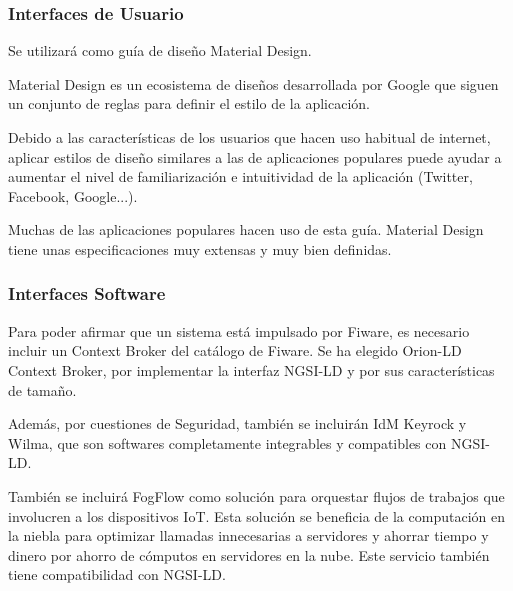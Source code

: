 \documentclass[12pt, a4paper, twoside]{article}
\begin{document}
\subsubsection{Interfaces de Usuario}
Se utilizará como guía de diseño Material Design.

Material Design es un ecosistema de diseños desarrollada por Google
que siguen un conjunto de reglas para definir el estilo de la aplicación.

Debido a las características de los usuarios que hacen uso habitual de internet,
aplicar estilos de diseño similares a las de aplicaciones populares puede ayudar a aumentar
el nivel de familiarización e intuitividad de la aplicación (Twitter, Facebook, Google...).

Muchas de las aplicaciones populares hacen uso de esta guía.
Material Design tiene unas especificaciones muy extensas y muy bien definidas. 

\subsubsection{Interfaces Software}
Para poder afirmar que un sistema está impulsado por Fiware, es necesario incluir un Context Broker del catálogo de Fiware.
Se ha elegido Orion-LD Context Broker, por implementar la interfaz NGSI-LD y por sus características de tamaño.

Además, por cuestiones de Seguridad, también se incluirán IdM Keyrock y Wilma, que son softwares completamente integrables y
compatibles con NGSI-LD. 

También se incluirá FogFlow como solución para orquestar flujos de trabajos que involucren a los dispositivos IoT. Esta solución 
se beneficia de la computación en la niebla para optimizar llamadas innecesarias a servidores y ahorrar tiempo y dinero por ahorro
de cómputos en servidores en la nube. Este servicio también tiene compatibilidad con NGSI-LD.
\end{document}
